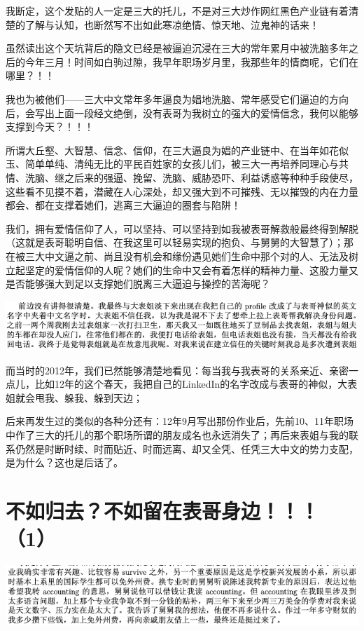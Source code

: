 \documentclass[9pt, b5paper]{article}
\begin{document}
我断定，这个发贴的人一定是三大的托儿，不是对三大炒作网红黑色产业链有着清楚的了解与认知，也断然写不出如此寒凉绝情、惊天地、泣鬼神的话来！

虽然读出这个天坑背后的隐文已经是被逼迫沉浸在三大的常年累月中被洗脑多年之后的今年三月！时间如白驹过隙，我早年职场岁月里，我那些年的情商呢，它们在哪里？！！

我也为被他们——三大中文常年多年逼良为娼地洗脑、常年感受它们逼迫的方向后，会写出上面一段经文绝倒，没有表哥为我树立的强大的爱情信念，我何以能够支撑到今天？！！！

所谓大丘壑、大智慧、信念、信仰，在三大逼良为娼的产业链中、在当年如花似玉、简单单纯、清纯无比的平民百姓家的女孩儿们，被三大一再培养同理心与共情、洗脑、继之后来的强逼、挽留、洗脑、威胁恐吓、利益诱惑等种种手段使尽，这些看不见摸不着，潜藏在人心深处，却又强大到不可摧残、无以摧毁的内在力量都会、都在支撑着她们，逃离三大逼迫的圈套与陷阱！

我们，拥有爱情信仰了人，可以坚持、可以坚持到如我被表哥解救般最终得到解脱（这就是表哥聪明自信、在我这里可以轻易实现的抱负、与舅舅的大智慧了）；那在被三大中文逼之前、尚且没有机会和缘份遇见她们生命中那个对的人、无法及树立起坚定的爱情信仰的人呢？她们的生命中又会有着怎样的精神力量、这股力量又是否能够强大到足以支撑她们脱离三大逼迫与操控的苦海呢？

\begin{center}
\includegraphics[width=.9\linewidth]{./pic/backups_plans_20210413_135837.png}
\end{center}

而当时的2012年，我们已然能够清楚地看见：每当我与我表哥的关系亲近、亲密一点儿，比如12年的这个春天，我把自己的LinkedIn的名字改成与表哥的神似，大表姐就会甩我、躲我、躲到天边；

后来再发生过的类似的各种分还有：12年9月写出那份作业后，先前10、11年职场中作了三大的托儿的那个职场所谓的朋友成名也永远消失了；再后来表姐与我的联系仍然是时断时续、时而贴近、时而远离、却又全凭、任凭三大中文的势力支配，是为什么？这也是后话了。 

\section{不如归去？不如留在表哥身边！！！（1）}
\label{sec:org96437ae}

\begin{center}
\includegraphics[width=.9\linewidth]{./pic/backups_plans_20210414_161250.png}
\end{center}
\end{document}
